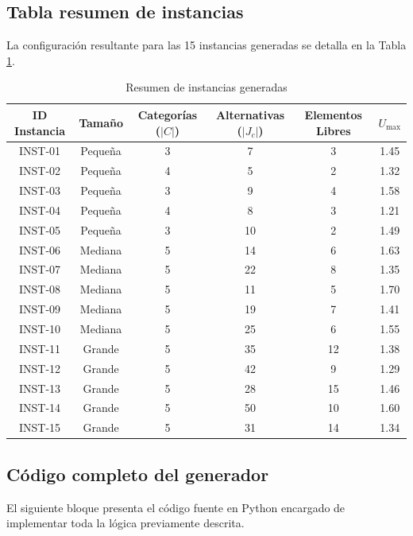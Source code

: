 \documentclass[journal, 12pt, onecolumn]{IEEEtran}
\begin{document}
\subsection{Tabla resumen de instancias}
La configuración resultante para las 15 instancias generadas se detalla en la Tabla \ref{tab:instancias}.

\begin{table}[H]
\centering
\caption{Resumen de instancias generadas}
\label{tab:instancias}
\begin{tabular}{|c|c|c|c|c|c|}
\hline
\textbf{ID Instancia} & \textbf{Tamaño} & \textbf{Categorías ($|C|$)} & \textbf{Alternativas ($|J_c|$)} & \textbf{Elementos Libres} & \textbf{$U_{\max}$} \\ \hline
INST-01 & Pequeña & 3 & 7 & 3 & 1.45 \\ \hline
INST-02 & Pequeña & 4 & 5 & 2 & 1.32 \\ \hline
INST-03 & Pequeña & 3 & 9 & 4 & 1.58 \\ \hline
INST-04 & Pequeña & 4 & 8 & 3 & 1.21 \\ \hline
INST-05 & Pequeña & 3 & 10 & 2 & 1.49 \\ \hline
INST-06 & Mediana & 5 & 14 & 6 & 1.63 \\ \hline
INST-07 & Mediana & 5 & 22 & 8 & 1.35 \\ \hline
INST-08 & Mediana & 5 & 11 & 5 & 1.70 \\ \hline
INST-09 & Mediana & 5 & 19 & 7 & 1.41 \\ \hline
INST-10 & Mediana & 5 & 25 & 6 & 1.55 \\ \hline
INST-11 & Grande & 5 & 35 & 12 & 1.38 \\ \hline
INST-12 & Grande & 5 & 42 & 9 & 1.29 \\ \hline
INST-13 & Grande & 5 & 28 & 15 & 1.46 \\ \hline
INST-14 & Grande & 5 & 50 & 10 & 1.60 \\ \hline
INST-15 & Grande & 5 & 31 & 14 & 1.34 \\ \hline
\end{tabular}
\end{table}

\subsection{Código completo del generador}
El siguiente bloque presenta el código fuente en Python encargado de implementar toda la lógica previamente descrita.
\end{document}
